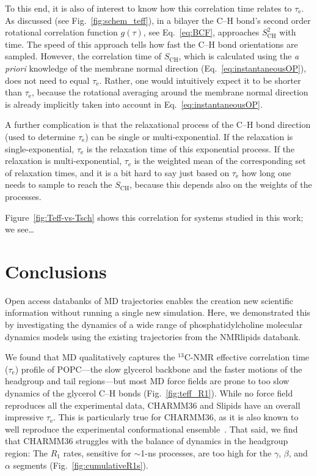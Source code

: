 \documentclass[journal=jpcbfk,manuscript=article,layout=twocolumn]{achemso}
\begin{document}
To this end, it is also of interest to know
how this correlation time relates to $\tau_\mathrm{e}$.
%
As discussed (see Fig.~\ref{fig:schem_teff}), 
in a bilayer the C--H bond's
second order rotational correlation function $g(\tau)$, see Eq.~\eqref{eq:BCF}, approaches $S^2_\mathrm{CH}$ with time. The speed of this approach tells how fast the C--H bond orientations are sampled.
%
However, the correlation time of $S_\mathrm{CH}$,
which is calculated using the {\it a priori} knowledge of the membrane normal direction (Eq.~\eqref{eq:instantaneousOP}),
does not need to equal $\tau_\mathrm e$.
Rather, one would intuitively expect it to be shorter than $\tau_\mathrm e$,
because the rotational averaging around the membrane normal direction is already implicitly taken into account in Eq.~\eqref{eq:instantaneousOP}.

A further complication is that the relaxational process of the C--H bond direction (used to determine $\tau_\mathrm e$) can be single or multi-exponential.
If the relaxation is single-exponential, $\tau_\mathrm e$ is the relaxation time of this exponential process. If the relaxation is multi-exponential, $\tau_\mathrm e$ is the weighted mean of the corresponding set of relaxation times, and it is a bit hard to say just based on $\tau_\mathrm e$ how long one needs to sample to reach the $S_\mathrm{CH}$, because this depends also on the weights of the processes.

Figure~\ref{fig:Teff-vs-Tsch} shows this correlation for systems studied in this work; we see\ldots
{}

\section{Conclusions}
Open access databanks of MD trajectories enables the creation new scientific information without running a single new simulation. Here,
we demonstrated this by investigating the dynamics of a wide range of phosphatidylcholine molecular dynamics models using the existing trajectories from the NMRlipids databank.

We found that MD qualitatively captures the $^{13}$C-NMR effective correlation time ($\tau_\mathrm e$) profile of POPC---the slow glycerol backbone and the faster motions of the headgroup and tail regions---but most MD force fields are prone to too slow dynamics of the glycerol C--H bonds (Fig.~\ref{fig:teff_R1}).
%
While no force field reproduces all the experimental data,
CHARMM36 and Slipids have an overall impressive $\tau_\mathrm e$.
This is particularly true for CHARMM36, as it is also known to
well reproduce the experimental conformational ensemble~\cite{botan15}.
%
That said, we find that CHARMM36 struggles with the balance of dynamics in the headgroup region:
The $R_1$ rates, sensitive for $\sim$1-ns processes, are too high for the $\gamma$, $\beta$, and $\alpha$ segments (Fig.~\ref{fig:cumulativeR1s}).
\end{document}
